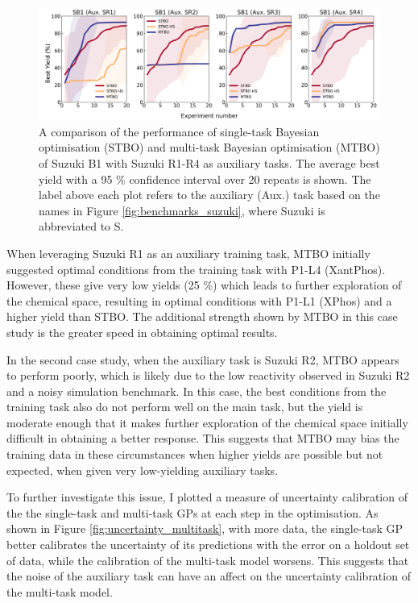 \begin{figure}
    \centering
    \includegraphics[width=1.2\textwidth]{gfx/Chapter04/baumgartner_suzuki_reizman_suzuki_one_cotraining_optimization.png}
    \caption{A comparison of the performance of single-task Bayesian optimisation (STBO) and multi-task Bayesian optimisation (MTBO) of Suzuki B1 with Suzuki R1-R4 as auxiliary tasks. The average best yield with a 95 \% confidence interval over 20 repeats is shown. The label above each plot refers to the auxiliary (Aux.) task based on the names in Figure \ref{fig:benchmarks_suzuki}, where Suzuki is abbreviated to S.}
    \label{fig:baumgartner_multitask}
\end{figure}

When leveraging Suzuki R1 as an auxiliary training task, MTBO initially suggested optimal conditions from the training task with P1-L4 (XantPhos). However, these give very low yields (25 \%) which leads to further exploration of the chemical space, resulting in optimal conditions with P1-L1 (XPhos) and a higher yield than STBO. The additional strength shown by MTBO in this case study is the greater speed in obtaining optimal results.

In the second case study, when the auxiliary task is Suzuki R2, MTBO appears to perform poorly, which is likely due to the low reactivity observed in Suzuki R2 and a noisy simulation benchmark. In this case, the best conditions from the training task also do not perform well on the main task, but the yield is moderate enough that it makes further exploration of the chemical space initially difficult in obtaining a better response. This suggests that MTBO may bias the training data in these circumstances when higher yields are possible but not expected, when given very low-yielding auxiliary tasks.

To further investigate this issue, I plotted a measure of uncertainty calibration of the the single-task and multi-task GPs at each step in the optimisation. As shown in Figure  \ref{fig:uncertainty_multitask}, with more data, the single-task GP better calibrates the uncertainty of its predictions with the error on a holdout set of data, while the calibration of the multi-task model worsens. This suggests that the noise of the auxiliary task can have an affect on the uncertainty calibration of the multi-task model.

